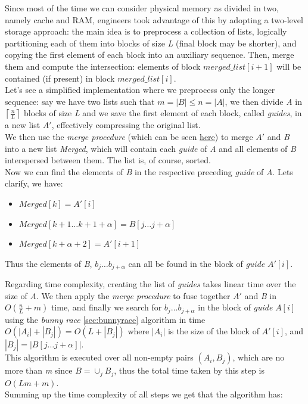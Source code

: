 Since most of the time we can consider physical memory as divided in two, namely cache and RAM, engineers took advantage of this by adopting a two-level storage approach: the main idea is to preprocess a collection of lists, logically partitioning each of them into blocks of size \textit{L} (final block may be shorter), and copying the first element of each block into an auxiliary sequence. Then, merge them and compute the intersection: elements of block $merged\_list[i+1]$ will be contained (if present) in block $merged\_list[i]$.\\
Let's see a simplified implementation where we preprocess only the longer sequence: say we have two lists such that $m=|B| \leq n=|A|$, we then divide \textit{A} in $\left\lceil \frac{n}{L} \right\rceil$ blocks of size \textit{L} and we save the first element of each block, called \textit{guides}, in a new list $A'$, effectively compressing the original list. \\
We then use the \textit{merge procedure} (which can be seen \href{https://en.wikipedia.org/wiki/Merge_algorithm}{here}) to merge $A'$ and \textit{B} into a new list \textit{Merged}, which will contain each \textit{guide} of \textit{A} and all elements of \textit{B} interspersed between them. The list is, of course, sorted.\\
Now we can find the elements of \textit{B} in the respective preceding \textit{guide} of \textit{A}. Lets clarify, we have:

\begin{itemize}
    \item $Merged[k] = A'[i]$
    \item $Merged[k+1 \ldots k+1+\alpha] = B[j \ldots j+\alpha]$
    \item $Merged[k+\alpha +2] = A'[i+1]$
\end{itemize}

Thus the elements of \textit{B}, $b_j \ldots b_{j+\alpha}$ can all be found in the block of \textit{guide} $A'[i]$.

Regarding time complexity, creating the list of \textit{guides} takes linear time over the size of \textit{A}. We then apply the \textit{merge procedure} to fuse together $A'$ and \textit{B} in $O\left(\frac{n}{L} +m \right)$ time, and finally we search for $b_j \ldots b_{j+\alpha}$ in the block of \textit{guide} $A[i]$ using the \textit{bunny race} \ref{sec:bunnyrace} algorithm in time $O\left(|A_i| + |B_j|\right) = O\left(L+|B_j|\right)$ where $|A_i|$ is the size of the block of $A'[i]$, and $|B_j| = \big|B[j \ldots j+\alpha]\big|$.\\
This algorithm is executed over all non-empty pairs $(A_i, B_j)$, which are no more than \textit{m} since $B = \cup_j B_j$, thus the total time taken by this step is $O(Lm+m)$.\\
Summing up the time complexity of all steps we get that the algorithm has:

